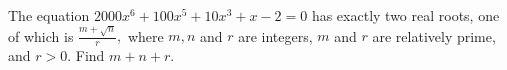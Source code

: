 The equation $2000x^6+100x^5+10x^3+x-2=0$ has exactly two real roots, one of which is $\frac{m+\sqrt{n}}r,$ where $m, n$ and $r$ are integers, $m$ and $r$ are relatively prime, and $r>0.$  Find $m+n+r.$